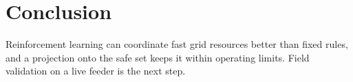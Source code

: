 \chapter{Conclusion}
\label{ch:conclusion}

Reinforcement learning can coordinate fast grid resources better than fixed rules, and a
projection onto the safe set keeps it within operating limits. Field validation on a live
feeder is the next step.
